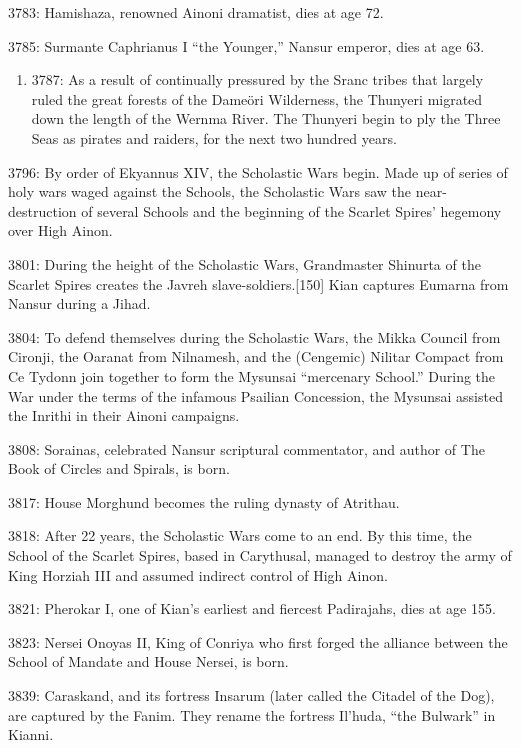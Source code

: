 \documentclass[]{book}
\providecommand{\tightlist}{%
  \setlength{\itemsep}{0pt}\setlength{\parskip}{0pt}}
\begin{document}
3783: Hamishaza, renowned Ainoni dramatist, dies at age 72.

3785: Surmante Caphrianus I ``the Younger,'' Nansur emperor, dies at age 63.

\begin{enumerate}
\def\labelenumi{\alph{enumi}.}
\setcounter{enumi}{2}
\tightlist
\item
  3787: As a result of continually pressured by the Sranc tribes that largely ruled the
  great forests of the Dameöri Wilderness, the Thunyeri migrated down the length of the Wernma River. The Thunyeri begin to ply the Three Seas as pirates and raiders, for the next two hundred years.
\end{enumerate}

3796: By order of Ekyannus XIV, the Scholastic Wars begin. Made up of series of holy wars waged against the Schools, the Scholastic Wars saw the near-destruction of several Schools and the beginning of the Scarlet Spires' hegemony over High Ainon.

3801: During the height of the Scholastic Wars, Grandmaster Shinurta of the Scarlet Spires creates the Javreh slave-soldiers.{[}150{]} Kian captures Eumarna from Nansur during a Jihad.

3804: To defend themselves during the Scholastic Wars, the Mikka Council from Cironji, the Oaranat from Nilnamesh, and the (Cengemic) Nilitar Compact from Ce Tydonn join together to form the Mysunsai ``mercenary School.'' During the War under the terms of the infamous Psailian Concession, the Mysunsai assisted the Inrithi in their Ainoni campaigns.

3808: Sorainas, celebrated Nansur scriptural commentator, and author of The Book of Circles and Spirals, is born.

3817: House Morghund becomes the ruling dynasty of Atrithau.

3818: After 22 years, the Scholastic Wars come to an end. By this time, the School of
the Scarlet Spires, based in Carythusal, managed to destroy the army of
King Horziah III and assumed indirect control of High Ainon.

3821: Pherokar I, one of Kian's earliest and fiercest Padirajahs, dies at age 155.

3823: Nersei Onoyas II, King of Conriya who first forged the alliance between the
School of Mandate and House Nersei, is born.

3839: Caraskand, and its fortress Insarum (later called the Citadel of the Dog), are
captured by the Fanim. They rename the fortress Il'huda, ``the Bulwark'' in Kianni.
\end{document}
